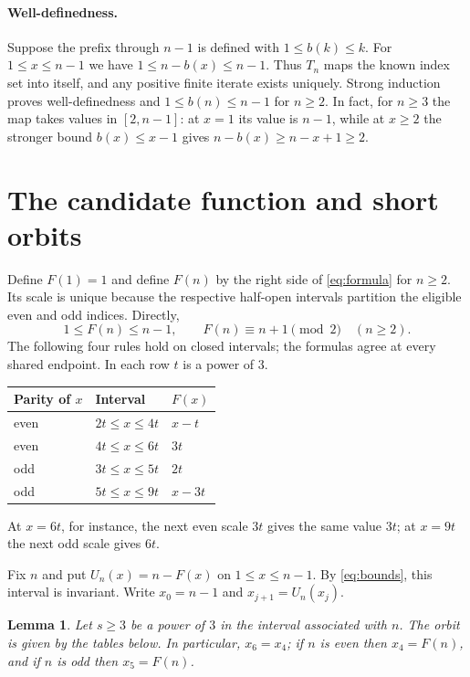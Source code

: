 \documentclass[10pt,a4paper]{article}
\newtheorem{lemma}{Lemma}
\begin{document}
\paragraph{Well-definedness.}
Suppose the prefix through $n-1$ is defined with $1\le b(k)\le k$.
For $1\le x\le n-1$ we have $1\le n-b(x)\le n-1$. Thus $T_n$ maps
the known index set into itself, and any positive finite iterate exists
uniquely. Strong induction proves well-definedness and
$1\le b(n)\le n-1$ for $n\ge2$. In fact, for $n\ge3$ the map takes
values in $[2,n-1]$: at $x=1$ its value is $n-1$, while at $x\ge2$ the
stronger bound $b(x)\le x-1$ gives $n-b(x)\ge n-x+1\ge2$.

\section{The candidate function and short orbits}
Define $F(1)=1$ and define $F(n)$ by the right side of
\eqref{eq:formula} for $n\ge2$. Its scale is unique because the respective
half-open intervals partition the eligible even and odd indices. Directly,
\begin{equation}\label{eq:bounds}
1\le F(n)\le n-1,\qquad F(n)\equiv n+1\pmod2\quad(n\ge2).
\end{equation}
The following four rules hold on closed intervals; the formulas agree at
every shared endpoint. In each row $t$ is a power of $3$.
\begin{center}
\begin{tabular}{lll}
\toprule
Parity of $x$ & Interval & $F(x)$\\
\midrule
even & $2t\le x\le4t$ & $x-t$\\
even & $4t\le x\le6t$ & $3t$\\
odd & $3t\le x\le5t$ & $2t$\\
odd & $5t\le x\le9t$ & $x-3t$\\
\bottomrule
\end{tabular}
\end{center}
At $x=6t$, for instance, the next even scale $3t$ gives the same value
$3t$; at $x=9t$ the next odd scale gives $6t$.

Fix $n$ and put $U_n(x)=n-F(x)$ on $1\le x\le n-1$. By
\eqref{eq:bounds}, this interval is invariant. Write $x_0=n-1$ and
$x_{j+1}=U_n(x_j)$.

\begin{lemma}\label{lem:orbit}
Let $s\ge3$ be a power of $3$ in the interval associated with $n$.
The orbit is given by the tables below. In particular, $x_6=x_4$;
if $n$ is even then $x_4=F(n)$, and if $n$ is odd then $x_5=F(n)$.
\end{lemma}
\end{document}
